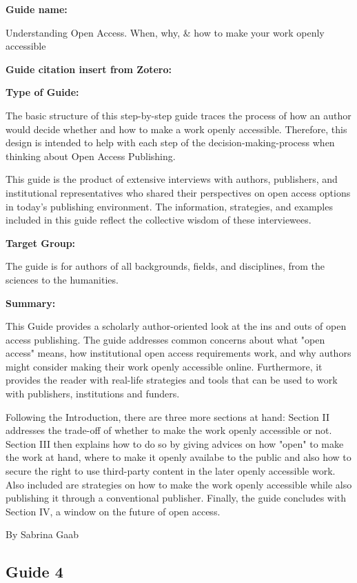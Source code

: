 \documentclass{article}
\begin{document}
\textbf{Guide name:} 

Understanding Open Access. When, why, \& how to make your work openly accessible


\textbf{Guide citation insert from Zotero:} 

\autocite{rubow_understanding_2015}


\textbf{Type of Guide:}

The basic structure of this step-by-step guide traces the process of how an author would decide whether and how to make a work openly accessible. Therefore, this design is intended to help with each step of the decision-making-process when thinking about Open Access Publishing. 


This guide is the product of extensive interviews with authors, publishers, and institutional representatives who shared their perspectives on open access options in today’s publishing environment. The information, strategies, and examples included in this guide reflect the collective wisdom of these interviewees.


\textbf{Target Group:}

The guide is for authors of all backgrounds, fields, and disciplines, from the sciences to the humanities.


\textbf{Summary:}

This Guide provides a scholarly author-oriented look at the ins and outs of open access publishing. The guide addresses common concerns about what "open access" means, how institutional open access requirements work, and why authors might consider making their work openly accessible online. Furthermore, it provides the reader with real-life strategies and tools that can be used to work with publishers, institutions and funders.


Following the Introduction, there are three more sections at hand: Section II addresses the trade-off of whether to make the work openly accessible or not. Section III then explains how to do so by giving advices on how "open" to make the work at hand, where to make it openly availabe to the public and also how to secure the right to use third-party content in the later openly accessible work. Also included are strategies on how to make the work openly accessible while also publishing it through a conventional publisher. Finally, the guide concludes with Section IV, a window on the future of open access.


By Sabrina Gaab 


\subsection{Guide 4}\label{H4741497}
\end{document}
